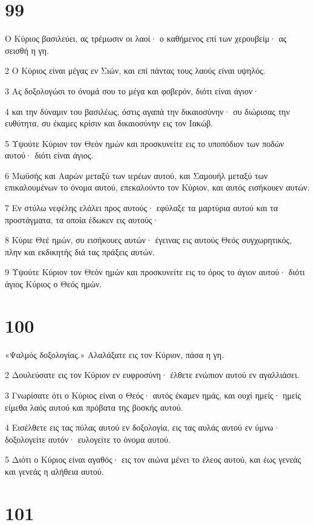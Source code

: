 \chapter{99}

\par Ο Κύριος βασιλεύει, ας τρέμωσιν οι λαοί· ο καθήμενος επί των χερουβείμ· ας σεισθή η γη.
\par 2 Ο Κύριος είναι μέγας εν Σιών, και επί πάντας τους λαούς είναι υψηλός.
\par 3 Ας δοξολογώσι το όνομά σου το μέγα και φοβερόν, διότι είναι άγιον·
\par 4 και την δύναμιν του βασιλέως, όστις αγαπά την δικαιοσύνην· συ διώρισας την ευθύτητα, συ έκαμες κρίσιν και δικαιοσύνην εις τον Ιακώβ.
\par 5 Υψούτε Κύριον τον Θεόν ημών και προσκυνείτε εις το υποπόδιον των ποδών αυτού· διότι είναι άγιος.
\par 6 Μωϋσής και Ααρών μεταξύ των ιερέων αυτού, και Σαμουήλ μεταξύ των επικαλουμένων το όνομα αυτού, επεκαλούντο τον Κύριον, και αυτός εισήκουεν αυτών.
\par 7 Εν στύλω νεφέλης ελάλει προς αυτούς· εφύλαξε τα μαρτύρια αυτού και τα προστάγματα, τα οποία έδωκεν εις αυτούς·
\par 8 Κύριε Θεέ ημών, συ εισήκουες αυτών· έγεινας εις αυτούς Θεός συγχωρητικός, πλην και εκδικητής διά τας πράξεις αυτών.
\par 9 Υψούτε Κύριον τον Θεόν ημών και προσκυνείτε εις το όρος το άγιον αυτού· διότι άγιος Κύριος ο Θεός ημών.

\chapter{100}

\par «Ψαλμός δοξολογίας.» Αλαλάξατε εις τον Κύριον, πάσα η γη.
\par 2 Δουλεύσατε εις τον Κύριον εν ευφροσύνη· έλθετε ενώπιον αυτού εν αγαλλιάσει.
\par 3 Γνωρίσατε ότι ο Κύριος είναι ο Θεός· αυτός έκαμεν ημάς, και ουχί ημείς· ημείς είμεθα λαός αυτού και πρόβατα της βοσκής αυτού.
\par 4 Εισέλθετε εις τας πύλας αυτού εν δοξολογία, εις τας αυλάς αυτού εν ύμνω· δοξολογείτε αυτόν· ευλογείτε το όνομα αυτού.
\par 5 Διότι ο Κύριος είναι αγαθός· εις τον αιώνα μένει το έλεος αυτού, και έως γενεάς και γενεάς η αλήθεια αυτού.

\chapter{101}

